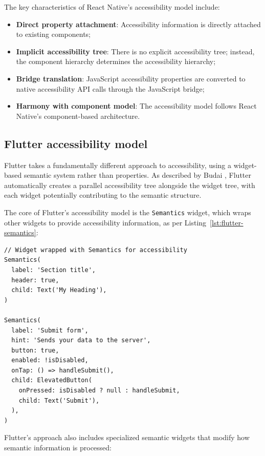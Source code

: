 The key characteristics of React Native's accessibility model include:

\begin{itemize}
    \item \textbf{Direct property attachment}: Accessibility information is directly attached to existing components;
    \item \textbf{Implicit accessibility tree}: There is no explicit accessibility tree; instead, the component hierarchy determines the accessibility hierarchy;
    \item \textbf{Bridge translation}: JavaScript accessibility properties are converted to native accessibility API calls through the JavaScript bridge;
    \item \textbf{Harmony with component model}: The accessibility model follows React Native's component-based architecture.
\end{itemize}

\subsection{Flutter accessibility model}
Flutter takes a fundamentally different approach to accessibility, using a widget-based semantic system rather than properties. As described by Budai \cite{budai2024mobile}, Flutter automatically creates a parallel accessibility tree alongside the widget tree, with each widget potentially contributing to the semantic structure.

The core of Flutter's accessibility model is the \texttt{Semantics} widget, which wraps other widgets to provide accessibility information, as per Listing~\ref{lst:flutter-semantics}:

\begin{lstlisting}[style=DartStyle, caption=Flutter Semantics widget system, label=lst:flutter-semantics]
// Widget wrapped with Semantics for accessibility
Semantics(
  label: 'Section title',
  header: true,
  child: Text('My Heading'),
)

Semantics(
  label: 'Submit form',
  hint: 'Sends your data to the server',
  button: true,
  enabled: !isDisabled,
  onTap: () => handleSubmit(),
  child: ElevatedButton(
    onPressed: isDisabled ? null : handleSubmit,
    child: Text('Submit'),
  ),
)
\end{lstlisting}

Flutter's approach also includes specialized semantic widgets that modify how semantic information is processed:

